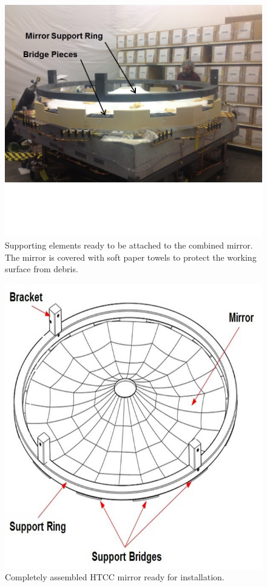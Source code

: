 \begin{figure}[ht]
    \centering
    \includegraphics[width=1.0\linewidth,trim={0 5cm 0 0},clip]{images/Support_Ring.jpg}
    \caption{Supporting elements ready to be attached to the combined mirror. The mirror is covered with soft
      paper towels to protect the working surface from debris.}
    \label{fig:Support_Ring}
\end{figure}

\begin{figure}[ht]
    \centering
        \includegraphics[width=1.0\linewidth]{images/Support_Ring_2.jpg}
    \caption{Completely assembled HTCC mirror ready for installation.}
    \label{fig:Ring_to_Mirror}
\end{figure}
 
